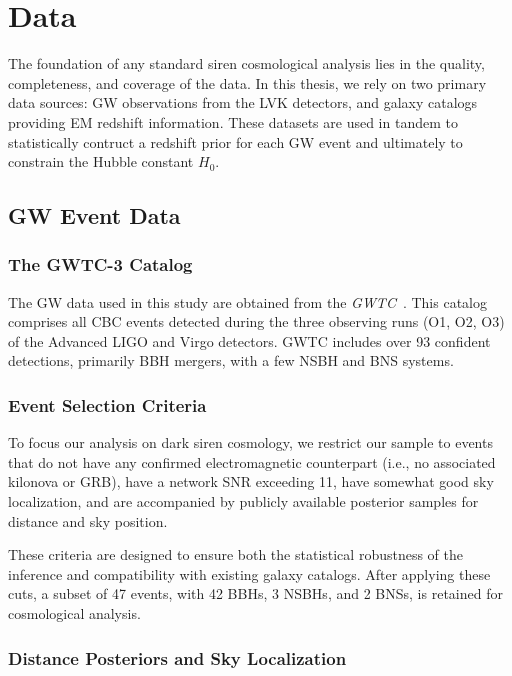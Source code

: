 \chapter{Data}
\label{chap:data}


The foundation of any standard siren cosmological analysis lies in the quality, completeness, and coverage of the data. In this thesis, we rely on two primary data sources: \ac{GW} observations from the \ac{LVK} detectors, and galaxy catalogs providing \ac{EM} redshift information. These datasets are used in tandem to statistically contruct a redshift prior for each \ac{GW} event and ultimately to constrain the Hubble constant $H_0$.

\section{\ac{GW} Event Data}

\subsection{The GWTC-3 Catalog}

The \ac{GW} data used in this study are obtained from the \textit{\ac{GWTC}}~\citep{abbott201gwtc1, abbott2021gwtc2, abbott2024gwtc21, abbott2023gwtc3}. This catalog comprises all \ac{CBC} events detected during the three observing runs (O1, O2, O3) of the Advanced LIGO and Virgo detectors. \ac{GWTC} includes over 93 confident detections, primarily \ac{BBH} mergers, with a few \ac{NSBH} and \ac{BNS} systems.

\subsection{Event Selection Criteria}

To focus our analysis on dark siren cosmology, we restrict our sample to events that do not have any confirmed electromagnetic counterpart (i.e., no associated kilonova or GRB), have a network \ac{SNR} exceeding 11, have somewhat good sky localization, and are accompanied by publicly available posterior samples for distance and sky position.

These criteria are designed to ensure both the statistical robustness of the inference and compatibility with existing galaxy catalogs. After applying these cuts, a subset of 47 events, with 42 \acp{BBH}, 3
\acp{NSBH}, and 2 \acp{BNS}, is retained for cosmological analysis.

\subsection{Distance Posteriors and Sky Localization}

